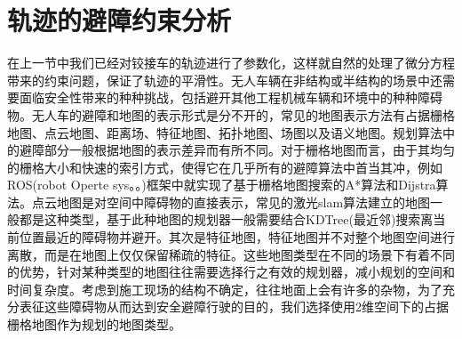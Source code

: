 \documentclass[master,academic]{ysuthesis} %
\begin{document}
	\section{轨迹的避障约束分析}
	在上一节中我们已经对铰接车的轨迹进行了参数化，这样就自然的处理了微分方程带来的约束问题，保证了轨迹的平滑性。无人车辆在非结构或半结构的场景中还需要面临安全性带来的种种挑战，包括避开其他工程机械车辆和环境中的种种障碍物。无人车的避障和地图的表示形式是分不开的，常见的地图表示方法有占据栅格地图、点云地图、距离场、特征地图、拓扑地图、场图以及语义地图。规划算法中的避障部分一般根据地图的表示差异而有所不同。对于栅格地图而言，由于其均匀的栅格大小和快速的索引方式，使得它在几乎所有的避障算法中首当其冲，例如ROS(robot Operte sys。。)框架中就实现了基于栅格地图搜索的A*算法和Dijstra算法。点云地图是对空间中障碍物的直接表示，常见的激光slam算法建立的地图一般都是这种类型，基于此种地图的规划器一般需要结合KDTree(最近邻)搜索离当前位置最近的障碍物并避开。其次是特征地图，特征地图并不对整个地图空间进行离散，而是在地图上仅仅保留稀疏的特征。这些地图类型在不同的场景下有着不同的优势，针对某种类型的地图往往需要选择行之有效的规划器，减小规划的空间和时间复杂度。考虑到施工现场的结构不确定，往往地面上会有许多的杂物，为了充分表征这些障碍物从而达到安全避障行驶的目的，我们选择使用2维空间下的占据栅格地图作为规划的地图类型。
\end{document}
